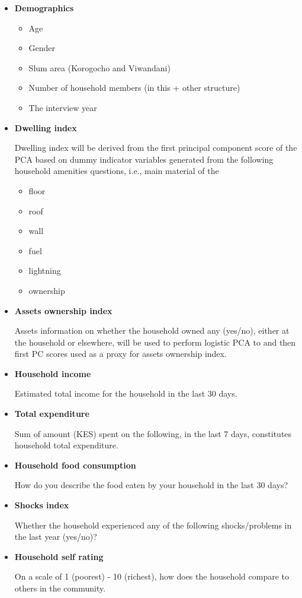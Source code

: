 \begin{itemize}
\item \textbf{Demographics}
\begin{itemize}
\item Age
\item Gender
\item Slum area (Korogocho and Viwandani)
\item  Number of household members (in this + other structure)
\item The interview year
\end{itemize}
\item \textbf{Dwelling index}

Dwelling index will be derived from the first principal component score of the PCA based on dummy indicator variables generated from the following household amenities questions, i.e., main material of the
\begin{itemize}
\item floor
\item roof
\item wall
\item fuel
\item lightning
\item ownership
\end{itemize}
\item \textbf{Assets ownership index}

Assets information on whether the household owned any (yes/no), either at the household or elsewhere, will be used to perform logistic PCA to and then first PC scores used as a proxy for assets ownership index.
\item \textbf{Household income}

Estimated total income for the household in the last 30 days.
\item \textbf{Total expenditure}

Sum of amount (KES) spent on the following, in the last 7 days, constitutes household total expenditure.
\item \textbf{Household food consumption}

How do you describe the food eaten by your household in the last 30 days?
\item \textbf{Shocks index}

Whether the household experienced any of the following shocks/problems in the last year (yes/no)?

\item \textbf{Household self rating}

On a scale of 1 (poorest) - 10 (richest), how does the household compare to others in the community.

\end{itemize}


